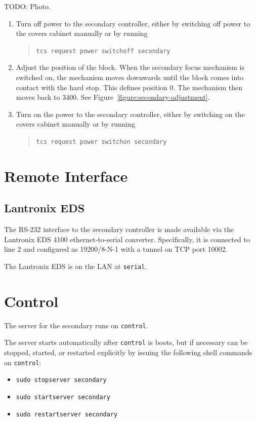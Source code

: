 TODO: Photo.

\begin{enumerate}
\item Turn off power to the secondary controller, either by switching off power to the covers cabinet manually or by running
\begin{quote}
\verb|tcs request power switchoff secondary|
\end{quote}
\item Adjust the position of the block. When the secondary focus mechanism is switched on, the mechanism moves downwards until the block comes into contact with the hard stop. This defines position 0. The mechanism then moves back to 3400. See Figure~\ref{figure:secondary-adjustment}.
\item Turn on the power to the secondary controller, either by switching on the covers cabinet manually or by running 
\begin{quote}
\verb|tcs request power switchon secondary|
\end{quote}
\end{enumerate}

\section{Remote Interface}

\subsection{Lantronix EDS}
\label{section:secondary-lantronix-eds}

The RS-232 interface to the secondary controller is made available via the Lantronix EDS 4100 ethernet-to-serial converter. Specifically, it is connected to line 2 and configured as 19200/8-N-1 with a tunnel on TCP port 10002.

The Lantronix EDS is on the LAN at \verb|serial|.

\section{Control}

The server for the secondary runs on \verb|control|. 

The server starts automatically after \verb|control| is boots, but if necessary can be stopped, started, or restarted explicitly by issuing the following shell commands on \verb|control|:
\begin{itemize}
\item
\verb|sudo stopserver secondary|
\item
\verb|sudo startserver secondary|
\item
\verb|sudo restartserver secondary|
\end{itemize}

